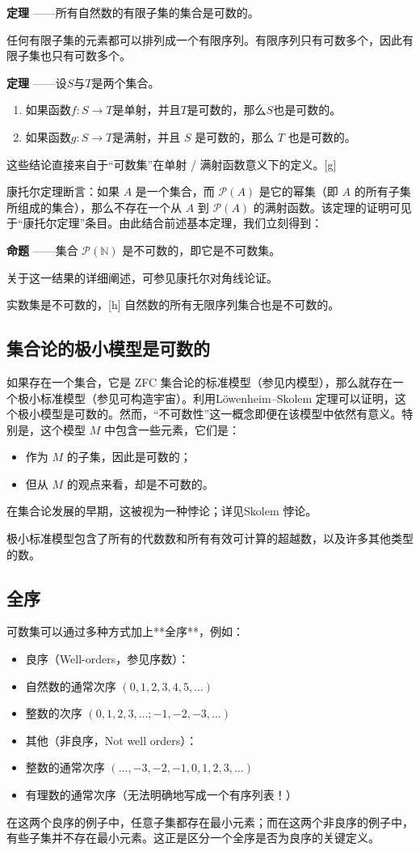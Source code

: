 \textbf{定理} ——所有自然数的有限子集的集合是可数的。

任何有限子集的元素都可以排列成一个有限序列。有限序列只有可数多个，因此有限子集也只有可数多个。

\textbf{定理} ——设$S$与$T$是两个集合。
\begin{enumerate}
\item 如果函数$f : S \to T$是单射，并且$T$是可数的，那么$S$也是可数的。
\item 如果函数$g : S \to T$是满射，并且 $S$ 是可数的，那么 $T$ 也是可数的。
\end{enumerate}

这些结论直接来自于“可数集”在单射 / 满射函数意义下的定义。[g]

康托尔定理断言：如果 $A$ 是一个集合，而 $\mathcal{P}(A)$ 是它的幂集（即 $A$ 的所有子集所组成的集合），那么不存在一个从 $A$ 到 $\mathcal{P}(A)$ 的满射函数。该定理的证明可见于“康托尔定理”条目。由此结合前述基本定理，我们立刻得到：

\textbf{命题} ——集合 $\mathcal{P}(\mathbb{N})$ 是不可数的，即它是不可数集。

关于这一结果的详细阐述，可参见康托尔对角线论证。

实数集是不可数的，[h] 自然数的所有无限序列集合也是不可数的。
\subsection{集合论的极小模型是可数的}
如果存在一个集合，它是 ZFC 集合论的标准模型（参见内模型），那么就存在一个极小标准模型（参见可构造宇宙）。利用Löwenheim–Skolem 定理可以证明，这个极小模型是可数的。然而，“不可数性”这一概念即便在该模型中依然有意义。特别是，这个模型 $M$ 中包含一些元素，它们是：
\begin{itemize}
\item 作为 $M$ 的子集，因此是可数的；
\item 但从 $M$ 的观点来看，却是不可数的。
\end{itemize}
在集合论发展的早期，这被视为一种悖论；详见Skolem 悖论。

极小标准模型包含了所有的代数数和所有有效可计算的超越数，以及许多其他类型的数。
\subsection{全序}

可数集可以通过多种方式加上**全序**，例如：

\begin{itemize}
\item 良序（Well-orders，参见序数）：
\item 自然数的通常次序 $(0, 1, 2, 3, 4, 5, \dots)$
\item 整数的次序 $(0, 1, 2, 3, \dots; -1, -2, -3, \dots)$
\item 其他（非良序，Not well orders）：
\item 整数的通常次序 $(\dots, -3, -2, -1, 0, 1, 2, 3, \dots)$
\item 有理数的通常次序（无法明确地写成一个有序列表！）
\end{itemize}
在这两个良序的例子中，任意子集都存在最小元素；而在这两个非良序的例子中，有些子集并不存在最小元素。这正是区分一个全序是否为良序的关键定义。

